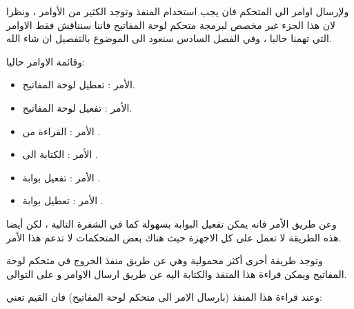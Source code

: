 \documentclass[document.tex]{subfiles}
\begin{document}
ولإرسال اوامر الي المتحكم فان يجب استخدام المنفذ  وتوجد الكثير من الأوامر ، ونظرا لان هذا الجزء غير مخصص لبرمجة متحكم لوحة المفاتيح فاننا سنناقش فقط الاوامر التي تهمنا حاليا ، وفي الفصل السادس سنعود الى الموضوع بالتفصيل ان شاء الله.

وقائمة الاوامر حاليا:
\begin{itemize}
\item الأمر : تعطيل لوحة المفاتيح.
\item الأمر : تفعيل لوحة المفاتيح.
\item الأمر : القراءة من .
\item الأمر : الكتابة الى .
\item الأمر : تفعيل بوابة .
\item الأمر : تعطيل بوابة .

\end{itemize}

وعن طريق الأمر  فانه يمكن تفعيل البوابة  بسهولة كما في الشفرة التالية ، لكن أيضا هذه الطريقة لا تعمل على كل الاجهزة حيث هناك بعض المتحكمات لا تدعم هذا الأمر.

\begin{english}
\lstset{numberstyle=\tiny,numbers=left,stepnumber=1,numbersep=5pt,tabsize=2,extendedchars=true,breaklines=true,frame=b,showspaces=false, showtabs=false,xleftmargin=10pt,framexleftmargin=10pt,framexrightmargin=5pt,framexbottommargin=4pt,showstringspaces=false,language=[x86masm]Assembler}


\end{english}

وتوجد طريقة أخرى أكثر محمولية وهي عن طريق منفذ الخروج  في متحكم لوحة المفاتيح ويمكن قراءة هذا المنفذ والكتابة اليه عن طريق ارسال الاوامر  و  على التوالي.

وعند قراءة هذا المنفذ (بارسال الامر  الى متحكم لوحة المفاتيح) فان القيم تعني:
\end{document}
